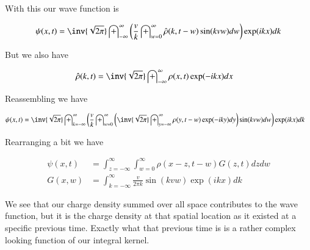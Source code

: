 \documentclass{article}
\newcommand{\IIinf}[0]{ \int_{-\infty}^\infty }
\begin{document}
With this our wave function is

\begin{align*}
{\psi}(x, t)
&=
\inv{\sqrt{2\pi}} \IIinf
\left(
\frac{v}{k} \int_{w = 0}^\infty \hat{\rho}(k, t-w) \sin( k v w ) dw
\right) \exp( i k x ) dk \\
\end{align*}


But we also have

\begin{align*}
\hat{\rho}(k,t) &= \inv{\sqrt{2\pi}} \int_{-\infty}^\infty {\rho}(x, t) \exp( -i k x ) dx
\end{align*}

Reassembling we have


\begin{align*}
{\psi}(x, t)
&=
\inv{\sqrt{2\pi}}
\int_{k = -\infty}^\infty
\left(
\frac{v}{k}
\int_{w = 0}^\infty
\left(
\inv{\sqrt{2\pi}} \int_{y=-\infty}^\infty {\rho}(y, t-w) \exp( -i k y ) dy
\right)
\sin( k v w ) dw
\right) \exp( i k x ) dk
\end{align*}

Rearranging a bit we have

\begin{align}
{\psi}(x, t)
&=
%
%
\int_{z=-\infty}^\infty
\int_{w = 0}^\infty
{\rho}(x-z, t-w) G(z, t) dz dw \\
G(x, w) &=
\int_{k = -\infty}^\infty
\frac{v}{2\pi k}
\sin( k v w )
\exp( i k x )
dk
\end{align}

We see that our charge density summed over all space contributes to the wave function, but it is the charge density at that spatial location as it existed at a specific previous time.
Exactly what that previous time is is a rather complex looking function of our integral kernel.

\end{document}
